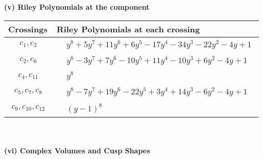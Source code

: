 \documentclass[1p]{elsarticle_modified}
\theoremstyle{definition}
\begin{document}
\newpage\renewcommand{\arraystretch}{1}
\flushleft \textbf{(v) Riley Polynomials at the component}\newline \\
\begin{tabular}{m{50pt}|m{274pt}}
Crossings & \hspace{64pt}Riley Polynomials at each crossing \\
\hline $$\begin{aligned}c_{1},c_{3}\end{aligned}$$&$\begin{aligned}
&y^8+5 y^7+11 y^6+6 y^5-17 y^4-34 y^3-22 y^2-4 y+1
\end{aligned}$\\
\hline $$\begin{aligned}c_{2},c_{6}\end{aligned}$$&$\begin{aligned}
&y^8-3 y^7+7 y^6-10 y^5+11 y^4-10 y^3+6 y^2-4 y+1
\end{aligned}$\\
\hline $$\begin{aligned}c_{4},c_{11}\end{aligned}$$&$\begin{aligned}
&y^8
\end{aligned}$\\
\hline $$\begin{aligned}c_{5},c_{7},c_{8}\end{aligned}$$&$\begin{aligned}
&y^8-7 y^7+19 y^6-22 y^5+3 y^4+14 y^3-6 y^2-4 y+1
\end{aligned}$\\
\hline $$\begin{aligned}c_{9},c_{10},c_{12}\end{aligned}$$&$\begin{aligned}
&(y-1)^8
\end{aligned}$\\
\hline
\end{tabular}\\~\\
\newpage\flushleft \textbf{(vi) Complex Volumes and Cusp Shapes}
\end{document}
